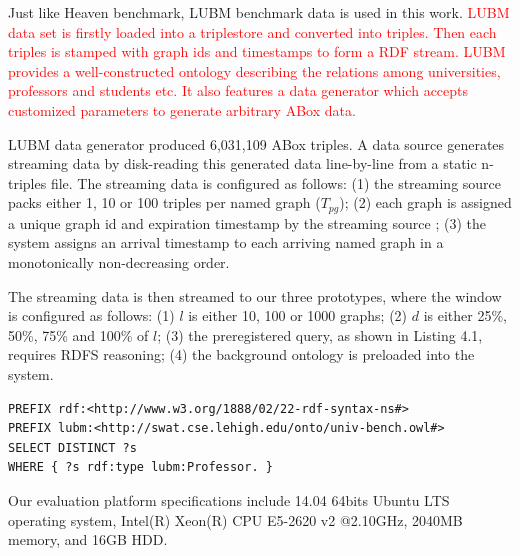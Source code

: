 Just like Heaven benchmark, LUBM benchmark\cite{guo2005lubm} data is used in this work. 
\textcolor{red}{
LUBM data set is firstly loaded into a triplestore and converted into triples. 
Then each triples is stamped with graph ids and timestamps to form a RDF stream.
LUBM provides a well-constructed ontology describing the relations among universities, professors and students etc.
It also features a data generator which accepts customized parameters to generate arbitrary ABox data.
}

LUBM data generator produced 6,031,109 ABox triples. 
A data source generates streaming data by disk-reading this generated data line-by-line from a static n-triples file.
The streaming data is configured  as follows:
(1) the streaming source packs either 1, 10 or 100 triples per named graph ($T_{pg}$);
(2) each graph is assigned a unique graph id and expiration timestamp by the streaming source \cite{jp2015stream};
(3) the system assigns an arrival timestamp to each arriving named graph in a monotonically non-decreasing order.

The streaming data is then streamed to our three prototypes, where the window is configured as follows:
(1) $l$ is either 10, 100 or 1000 graphs;
(2) $d$ is either 25\%, 50\%, 75\% and 100\% of $l$;
(3) the preregistered query, as shown in Listing 4.1, requires RDFS reasoning;
(4) the background ontology is preloaded into the system.

\begin{lstlisting}[caption=\textbf{SPARQL Query},basicstyle=\small,frame=single]
PREFIX rdf:<http://www.w3.org/1888/02/22-rdf-syntax-ns#>
PREFIX lubm:<http://swat.cse.lehigh.edu/onto/univ-bench.owl#>
SELECT DISTINCT ?s
WHERE { ?s rdf:type lubm:Professor. }
\end{lstlisting}

Our evaluation platform specifications include 14.04 64bits Ubuntu LTS operating system, Intel(R) Xeon(R) CPU E5-2620 v2 @2.10GHz, 2040MB memory, and 16GB HDD. 

